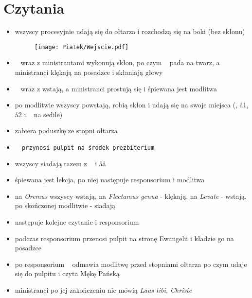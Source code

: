 \section{Czytania}

\begin{itemize}
    \item wszyscy procesyjnie udają się do ołtarza i rozchodzą się na boki (bez
          skłonu)
          \begin{figure}[h]
              \centering
              \texttt{[image: Piatek/Wejscie.pdf]}
          \end{figure}
    \item \ii~ wraz z ministrantami wykonują skłon, po czym \ii~ pada na twarz,
          a ministranci klękają na posadzce i skłaniają głowy
    \item \ii~ wraz z  wstają, a ministranci prostują się i śpiewana jest
          modlitwa
    \item po modlitwie wszyscy powstają, robią skłon i udają się na swoje
          miejsca (\ii, \aa1, \aa2 i \cc~ na sedile)
    \item {} zabiera poduszkę ze stopni ołtarza
    \item \tt~ przynosi pulpit na środek prezbiterium
    \item wszyscy siadają razem z \ii~ i \aa\aa
    \item śpiewana jest lekcja, po niej następuje responsorium i modlitwa
    \item na \textit{Oremus} wszyscy wstają, na \textit{Flectamus genua} -
          klękają, na \textit{Levate} - wstają, po skończonej modlitwie -
          siadają
    \item następuje kolejne czytanie i responsorium
    \item podczas responsorium  przenosi pulpit na stronę Ewangelii i
          kładzie go na posadzce
    \item po responsorium \ii~ odmawia modlitwę przed stopniami ołtarza po czym
          udaje się do pulpitu i czyta Mękę Pańską
    \item ministranci po jej zakończeniu nie mówią \textit{Laus tibi, Christe}
\end{itemize}